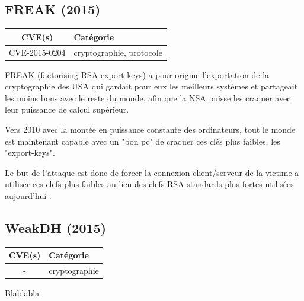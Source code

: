 

\subsection{FREAK (2015)}

\begin{tabularx}{0.96\textwidth}{|c|X|}
  \hline
  \textbf{CVE(s)} & \textbf{Catégorie} \\
  \hline
  CVE-2015-0204 & cryptographie, protocole \\
  \hline
\end{tabularx}

\vspace{1em}

FREAK (factorising RSA export keys) a pour origine l'exportation de la cryptographie des USA qui gardait pour eux les meilleurs systèmes et partageait les moins bons avec le reste du monde, afin que la NSA puisse les craquer avec leur puissance de calcul supérieur.

Vers 2010 avec la montée en puissance constante des ordinateurs, tout le monde est maintenant capable avec un "bon pc" de craquer ces clés plus faibles, les "export-keys".

Le but de l'attaque est donc de forcer la connexion client/serveur de la victime a utiliser ces clefs plus faibles au lieu des clefs RSA standards plus fortes utilisées aujourd'hui \cite{freak}.




\subsection{WeakDH (2015)}

\begin{tabularx}{0.96\textwidth}{|c|X|}
  \hline
  \textbf{CVE(s)} & \textbf{Catégorie} \\
  \hline
  - & cryptographie \\
  \hline
\end{tabularx}

\vspace{1em}

Blablabla \cite{weakdh}



